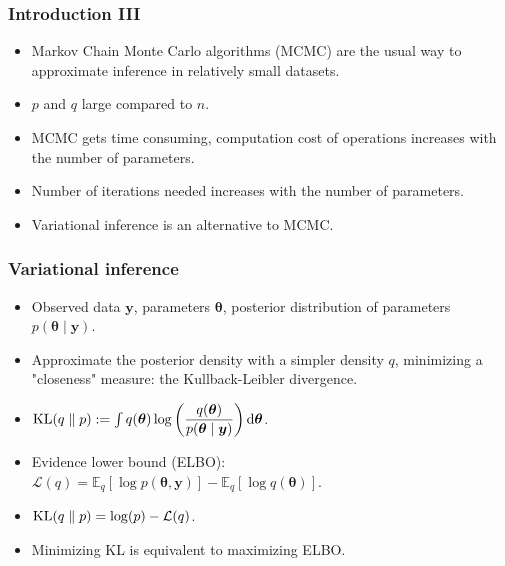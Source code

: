 \documentclass{beamer}
\DeclareMathOperator*{\KL}{{\rm KL}}
\begin{document}
\begin{frame}
\frametitle{Introduction III}
\begin{itemize}
\item Markov Chain Monte Carlo algorithms (MCMC) are the usual way to approximate inference in relatively small datasets.
\item $p$ and $q$ large compared to $n$.
\item MCMC gets time consuming, computation cost of operations increases with the number of parameters.
\item Number of iterations needed increases with the number of parameters.
\item Variational inference is an alternative to MCMC. 
\end{itemize}
\end{frame}

\begin{frame}
\frametitle{Variational inference}
\begin{itemize}
\item Observed data $\boldsymbol{y}$, parameters $\boldsymbol{\theta}$, posterior distribution of parameters $p(\boldsymbol{\theta} \mid \boldsymbol{y})$.
\item Approximate the posterior density with a simpler density $q$, minimizing a "closeness" measure: the Kullback-Leibler divergence.
\item $\KL(q\parallel p) := \int q(\boldsymbol{\theta})\log \left(\dfrac{q(\boldsymbol{\theta})}{p(\boldsymbol{\theta} \mid \boldsymbol{y})}\right) \mathrm{d}\boldsymbol{\theta}$.
\item Evidence lower bound (ELBO): $\mathcal{L}(q) = \mathbb{E}_q\left[\log p(\boldsymbol{\theta},\boldsymbol{y})\right] - \mathbb{E}_q\left[\log q(\boldsymbol{\theta})\right]$.
\item $\KL(q\parallel p) = \log(p) - \mathcal{L}(q)$.
\item Minimizing KL is equivalent to maximizing ELBO.
\end{itemize}
\end{frame}
\end{document}
